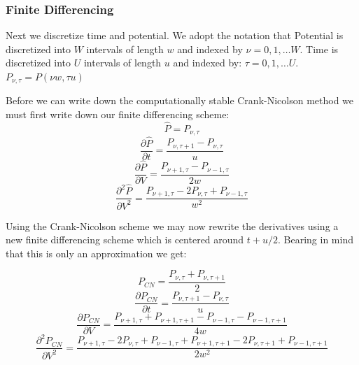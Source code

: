 \documentclass[10pt]{article}
\begin{document}
\subsubsection{Finite Differencing}

Next we discretize time and potential. We adopt the notation that
Potential is discretized into $W$ intervals of length $w$ and indexed
by $\nu= 0,1, \dots W $.  Time is discretized  into $U$ intervals of
length $u$ and indexed by: $\tau= 0,1, \dots U $.
$P_{\nu,\tau} = P(\nu w,\tau u)$

Before we can write down the computationally stable Crank-Nicolson
method \cite{press} we must first write down our finite differencing scheme:
\begin{equation}
    \hat{P} = P_{\nu,\tau}
\end{equation}
\begin{equation}
    \frac{\partial \hat{P}}{\partial t} = \frac{P_{\nu,\tau +1 } -
    P_{\nu,\tau}}{u}
\end{equation}
\begin{equation}
    \frac{\partial \hat{P}}{\partial V} = 
    \frac{P_{\nu +1,\tau } -
    P_{\nu - 1,\tau } }
    {2w}
\end{equation}
\begin{equation}
    \frac{\partial^2 \hat{P}}{\partial V^2} = 
    \frac{P_{\nu+1,\tau} - 2 P_{\nu,\tau} + P_{\nu-1,\tau}}
    {w^2}
\end{equation}

Using the Crank-Nicolson scheme we  may now rewrite the derivatives
using a new finite differencing scheme which is centered around $t +
u/2$. Bearing in mind that this is only
an approximation we get:


\begin{equation}
    P_{CN} = \frac{P_{\nu,\tau} + P_{\nu,\tau + 1}}{2}
\end{equation}
\begin{equation}
    \frac{\partial P_{CN}}{\partial t} = \frac{P_{\nu,\tau +1 } -
    P_{\nu,\tau}}{u}
\end{equation}
\begin{equation}
    \frac{\partial P_{CN}}{\partial V} = 
    \frac{P_{\nu +1,\tau } + P_{\nu +1,\tau +1 } -
    P_{\nu - 1,\tau } - P_{\nu -1,\tau +1}} 
    {4w}
\end{equation}
\begin{equation}
    \frac{\partial^2 P_{CN}}{\partial V^2} = 
    \frac{P_{\nu+1,\tau} - 2 P_{\nu,\tau} + P_{\nu-1,\tau} +
    P_{\nu+1,\tau+1} - 2 P_{\nu,\tau+1} + P_{\nu-1,\tau+1}}
    {2w^2}
\end{equation}
\end{document}
